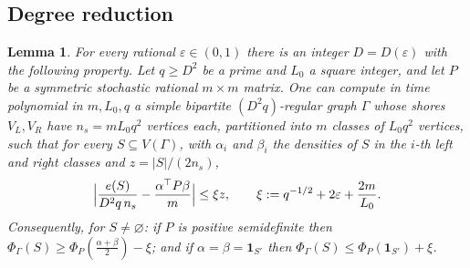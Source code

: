 \documentclass[11pt,letterpaper]{article}
\newtheorem{lemma}[theorem]{Lemma}
\theoremstyle{definition}
\theoremstyle{remark}
\newcommand{\eps}{\varepsilon}
\newcommand{\ind}{\mathbf 1}
\begin{document}
\subsection{Degree reduction}

\begin{lemma}\label{lem:degree}
For every rational \(\eps\in(0,1)\) there is an integer \(D=D(\eps)\) with
the following property. Let \(q\ge D^2\) be a prime and \(L_0\) a square
integer, and let \(P\) be a symmetric stochastic rational \(m\times m\)
matrix. One can compute in time polynomial in \(m,L_0,q\) a simple bipartite
\((D^2q)\)-regular graph \(\Gamma\) whose shores \(V_L,V_R\) have
\(n_s=mL_0q^2\) vertices each, partitioned into \(m\) classes of \(L_0q^2\)
vertices, such that for every \(S\subseteq V(\Gamma)\), with \(\alpha_i\)
and \(\beta_i\) the densities of \(S\) in the \(i\)-th left and right classes
and \(z=|S|/(2n_s)\),
\[
\Bigl|\frac{e(S)}{D^2q\,n_s}-\frac{\alpha^{\top}P\beta}{m}\Bigr|\le
\xi z,\qquad \xi:=q^{-1/2}+2\eps+\frac{2m}{L_0}.
\]
Consequently, for \(S\ne\varnothing\): if \(P\) is positive semidefinite then
\(\Phi_\Gamma(S)\ge\Phi_P(\frac{\alpha+\beta}2)-\xi\); and if
\(\alpha=\beta=\ind_{S'}\) then \(\Phi_\Gamma(S)\le\Phi_P(\ind_{S'})+\xi\).
\end{lemma}
\end{document}
